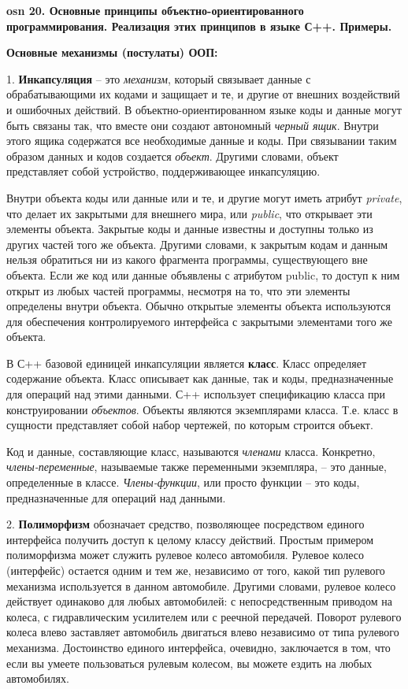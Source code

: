 \setcounter{section}{15}
\setcounter{subsection}{20}
\setcounter{equation}{0}
\textbf{\LARGE osn 20. Основные принципы объектно-ориентированного программирования. Реализация этих принципов в языке С++. Примеры.}


\centerline{\textbf{Основные механизмы (постулаты) ООП:}}

1. \textbf{Инкапсуляция} -- это \textit{механизм}, который связывает данные с обрабатывающими их кодами и защищает и те, и другие от внешних воздействий и ошибочных действий. В объектно-ориентированном языке коды и данные могут быть связаны так, что вместе они создают автономный \textit{черный ящик}. Внутри этого ящика содержатся все необходимые данные и коды. При связывании таким образом данных и кодов создается \textit{объект}. Другими словами, объект представляет собой устройство, поддерживающее инкапсуляцию.
    
Внутри объекта коды или данные или и те, и другие могут иметь атрибут \textit{private}, что делает их закрытыми для внешнего мира, или \textit{public}, что открывает эти элементы объекта. Закрытые коды и данные известны и доступны только из других частей того же объекта. Другими словами, к закрытым кодам и данным нельзя обратиться ни из какого фрагмента программы, существующего вне объекта. Если же код или данные объявлены с атрибутом public, то доступ к ним открыт из любых частей программы, несмотря на то, что эти элементы определены внутри объекта. Обычно открытые элементы объекта используются для обеспечения контролируемого интерфейса с закрытыми элементами того же объекта.
    
В С++ базовой единицей инкапсуляции является \textbf{класс}. Класс определяет содержание объекта. Класс описывает как данные, так и коды, предназначенные для операций над этими данными. С++ использует спецификацию класса при конструировании \textit{объектов}. Объекты являются экземплярами класса. Т.е. класс в сущности представляет собой набор чертежей, по которым строится объект.
    
Код и данные, составляющие класс, называются \textit{членами} класса. Конкретно, \textit{члены-переменные}, называемые также переменными экземпляра, -- это данные, определенные в классе. \textit{Члены-функции}, или просто функции -- это коды, предназначенные для операций над данными.
    
2. \textbf{Полиморфизм} обозначает средство, позволяющее посредством единого интерфейса получить доступ к целому классу действий. Простым примером полиморфизма может служить рулевое колесо автомобиля. Рулевое колесо (интерфейс) остается одним и тем же, независимо от того, какой тип рулевого механизма используется в данном автомобиле. Другими словами, рулевое колесо действует одинаково для любых автомобилей: с непосредственным приводом на колеса, с гидравлическим усилителем или с реечной передачей. Поворот рулевого колеса влево заставляет автомобиль двигаться влево независимо от типа рулевого механизма. Достоинство единого интерфейса, очевидно, заключается в том, что если вы умеете пользоваться рулевым колесом, вы можете ездить на любых автомобилях.
    
